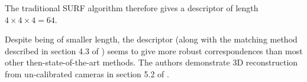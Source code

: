 The traditional SURF algorithm therefore gives a descriptor of length $4\times 4\times 4 = 64$. 

Despite being of smaller length, the descriptor (along with the matching method described in section 4.3 of \cite{surf-detailed-article-bay}) seems to give more robust correspondences than most other then-state-of-the-art methods. The authors demonstrate 3D reconstruction from un-calibrated cameras in section 5.2 of \cite{surf-detailed-article-bay}.
